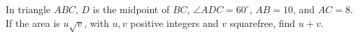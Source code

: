 In triangle $ABC$, $D$ is the midpoint of $BC$, $\angle ADC=60^\circ$, $AB=10$, and $AC=8$. If the area is $u\sqrt v$, with $u,v$ positive integers and $v$ squarefree, find $u+v$.
